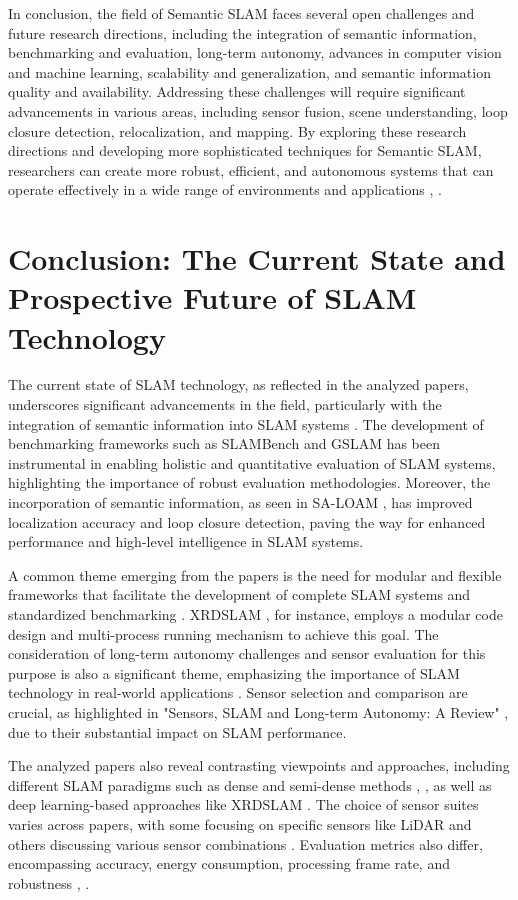 \documentclass[conference]{IEEEtran}
\begin{document}
In conclusion, the field of Semantic SLAM faces several open challenges and future research directions, including the integration of semantic information, benchmarking and evaluation, long-term autonomy, advances in computer vision and machine learning, scalability and generalization, and semantic information quality and availability. Addressing these challenges will require significant advancements in various areas, including sensor fusion, scene understanding, loop closure detection, relocalization, and mapping. By exploring these research directions and developing more sophisticated techniques for Semantic SLAM, researchers can create more robust, efficient, and autonomous systems that can operate effectively in a wide range of environments and applications \cite{b23}, \cite{b24}.

\section{Conclusion: The Current State and Prospective Future of SLAM Technology}
The current state of SLAM technology, as reflected in the analyzed papers, underscores significant advancements in the field, particularly with the integration of semantic information into SLAM systems \cite{b1}. The development of benchmarking frameworks such as SLAMBench \cite{b2} and GSLAM \cite{b3} has been instrumental in enabling holistic and quantitative evaluation of SLAM systems, highlighting the importance of robust evaluation methodologies. Moreover, the incorporation of semantic information, as seen in SA-LOAM \cite{b4}, has improved localization accuracy and loop closure detection, paving the way for enhanced performance and high-level intelligence in SLAM systems.

A common theme emerging from the papers is the need for modular and flexible frameworks that facilitate the development of complete SLAM systems and standardized benchmarking \cite{b5}. XRDSLAM \cite{b6}, for instance, employs a modular code design and multi-process running mechanism to achieve this goal. The consideration of long-term autonomy challenges and sensor evaluation for this purpose is also a significant theme, emphasizing the importance of SLAM technology in real-world applications \cite{b7}. Sensor selection and comparison are crucial, as highlighted in "Sensors, SLAM and Long-term Autonomy: A Review" \cite{b8}, due to their substantial impact on SLAM performance.

The analyzed papers also reveal contrasting viewpoints and approaches, including different SLAM paradigms such as dense and semi-dense methods \cite{b9}, \cite{b10}, as well as deep learning-based approaches like XRDSLAM \cite{b6}. The choice of sensor suites varies across papers, with some focusing on specific sensors like LiDAR \cite{b4} and others discussing various sensor combinations \cite{b8}. Evaluation metrics also differ, encompassing accuracy, energy consumption, processing frame rate, and robustness \cite{b2}, \cite{b3}.
\end{document}
